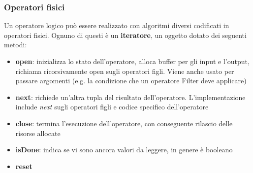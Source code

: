 \subsubsection{Operatori fisici}
Un operatore logico può essere realizzato con algoritmi diversi codificati in operatori fisici. Ognuno di questi è un \textbf{iteratore}, un oggetto dotato dei seguenti metodi:
\begin{itemize}
	\item \textbf{open}: inizializza lo stato dell’operatore, alloca buffer per gli input e l’output, richiama ricorsivamente open sugli operatori figli. Viene anche usato per passare argomenti (e.g. la condizione che un operatore Filter deve applicare)
	\item \textbf{next}: richiede un’altra tupla del risultato dell’operatore. L’implementazione include \textit{next} sugli operatori figli e codice specifico dell’operatore
	\item \textbf{close}: termina l’esecuzione dell’operatore, con conseguente rilascio delle risorse allocate
	\item \textbf{isDone}: indica se vi sono ancora valori da leggere, in genere è booleano
	\item \textbf{reset}
\end{itemize}

